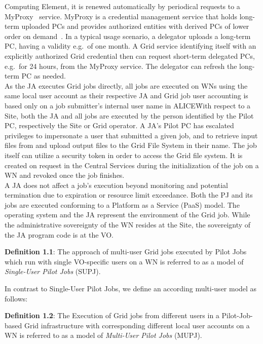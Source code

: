\documentclass[10pt]{iopart}
\newcommand{\alice}{ALICE}
\begin{document}
Computing Element, it is renewed automatically by periodical requests to a
MyProxy~\cite{myproxy2} service. MyProxy is a credential management service
that holds long-term uploaded PCs and provides authorized entities with
derived PCs of lower order on demand~\cite{myproxy1}. In a typical usage
scenario, a delegator uploads a long-term PC, having a validity e.g.\ of one
month. A Grid service identifying itself with an explicitly authorized Grid
credential
then can request short-term delegated PCs, e.g.\ for 24 hours, from the MyProxy
service. The delegator can refresh the long-term PC as needed.
\\
As the JA executes Grid jobs directly, all jobs are executed on WNs
using the same local user account as their respective JA and Grid job user accounting is
based only on a job submitter's internal user name in \alice\. With respect to a
Site, both the JA and all jobs are executed by the person
identified by the Pilot PC, respectively the Site or Grid operator.
A JA's Pilot PC has escalated privileges to impersonate a user
that submitted a given job, and to retrieve input files from and upload
output files to the Grid File System in their name. 
The job itself can utilize a security token in order to access the Grid file
system. It is created on request in the Central Services during the
initialization of the job on a WN and revoked once the job finishes.\\
A JA does not affect a job's execution beyond
monitoring and potential termination due to expiration or resource limit 
exceedance. Both the 
PJ and its jobs are executed conforming to a Platform as a Service (PaaS)
model.
The operating system and the JA represent the environment of the Grid job.
While the administrative sovereignty of the WN resides at
the Site, the sovereignty of the JA program code is
at the VO.\\
\par
\begingroup
\leftskip=0.4cm
\noindent
\textbf{Definition 1.1}: 
The approach of multi-user Grid jobs executed by Pilot Jobs which run with
single VO-specific users on a WN is referred to as a model of
\textit{Single-User Pilot Jobs} (SUPJ).\\
\par
\endgroup\noindent
In contrast to Single-User Pilot Jobs, we define an according multi-user model
as follows:\\
\par
\begingroup
\leftskip=0.4cm
\noindent
\textbf{Definition 1.2}: 
The Execution of Grid jobs from different users in a Pilot-Job-based Grid
infrastructure with corresponding different local user accounts on a WN is
referred to as a model of \textit{Multi-User
Pilot Jobs} (MUPJ).\\
\par
\endgroup\noindent
\end{document}
